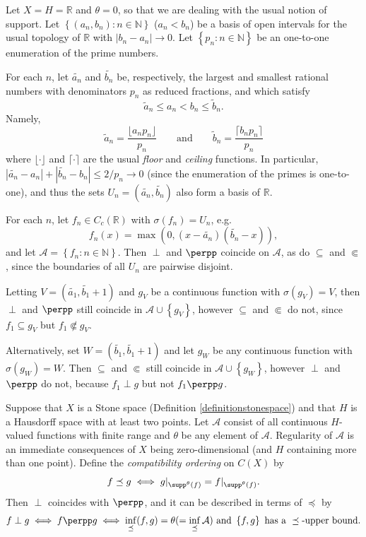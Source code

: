 \begin{example}
Let $X=H=\mathbb{R}$ and $\theta=0$, so that we are dealing with the usual notion of support. Let $\left\{(a_n,b_n):n\in\mathbb{N}\right\}$ ($a_n<b_n$) be a basis of open intervals for the usual topology of $\mathbb{R}$ with $|b_n-a_n|\to 0$. Let $\left\{p_n:n\in\mathbb{N}\right\}$ be an one-to-one enumeration of the prime numbers.

For each $n$, let $\widetilde{a_n}$ and $\widetilde{b_n}$ be, respectively, the largest and smallest rational numbers with denominators $p_n$ as reduced fractions, and which satisfy
\[\widetilde{a}_n\leq a_n<b_n\leq \widetilde{b}_n.\]
Namely,
\[\widetilde{a}_n=\frac{\lfloor a_np_n\rfloor}{p_n}\qquad\text{and}\qquad\widetilde{b}_n=\frac{\lceil b_np_n\rceil}{p_n}\]
where $\lfloor\cdot\rfloor$ and $\lceil\cdot\rceil$ are the usual \emph{floor} and \emph{ceiling} functions. In particular, $|\widetilde{a_n}-a_n|+|\widetilde{b_n}-b_n|\leq 2/p_n\to 0$ (since the enumeration of the primes is one-to-one), and thus the sets $U_n=(\widetilde{a_n},\widetilde{b_n})$ also form a basis of $\mathbb{R}$.

For each $n$, let $f_n\in C_c(\mathbb{R})$ with $\sigma(f_n)=U_n$, e.g.
\[f_n(x)=\max(0,(x-\widetilde{a_n})(\widetilde{b_n}-x)),\]
and let $\mathcal{A}=\left\{f_n:n\in\mathbb{N}\right\}$. Then $\perp$ and $\perpp$ coincide on $\mathcal{A}$, as do $\subseteq$ and $\Subset$, since the boundaries of all $U_n$ are pairwise disjoint.

Letting $V=(\widetilde{a_1},\widetilde{b_1}+1)$ and $g_V$ be a continuous function with $\sigma(g_V)=V$, then $\perp$ and $\perpp$ still coincide in $\mathcal{A}\cup\left\{g_V\right\}$, however $\subseteq$ and $\Subset$ do not, since $f_1\subseteq g_V$ but $f_1\not\Subset g_V$.

Alternatively, set $W=(\widetilde{b_1},\widetilde{b_1}+1)$ and let $g_W$ be any continuous function with $\sigma(g_W)=W$. Then $\subseteq$ and $\Subset$ still coincide in $\mathcal{A}\cup\left\{g_W\right\}$, however $\perp$ and $\perpp$ do not, because $f_1\perp g$ but not $f_1\perpp g$.
\end{example}

\begin{example}\label{examplekaniarmoutil}
Suppose that $X$ is a Stone space (Definition \ref{definitionstonespace}) and that $H$ is a Hausdorff space with at least two points. Let $\mathcal{A}$ consist of all continuous $H$-valued functions with finite range and $\theta$ be any element of $\mathcal{A}$. Regularity of $\mathcal{A}$ is an immediate consequences of $X$ being zero-dimensional (and $H$ containing more than one point). Define the \emph{compatibility ordering} on $C(X)$ by
\[f\preceq g\iff g|_{\supp^\theta(f)}=f|_{\supp^\theta(f)}.\]
Then $\perp$ coincides with $\perpp$, and it can be described in terms of $\preceq$ by
\[f\perp g\iff f\perpp g\iff\inf_{\preceq}(f,g)=\theta(=\inf_{\preceq}\mathcal{A})\text{ and }\left\{f,g\right\}\text{ has a }\preceq\text{-upper bound.}\]
\end{example}

